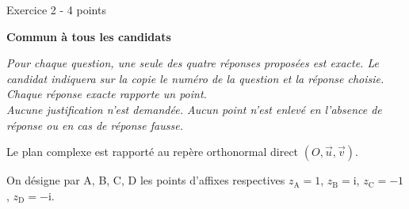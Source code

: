 
%
\begin{h2}Exercice 2 - 4 points\end{h2}
\textbf{Commun à tous les candidats}
\par
\textit{Pour chaque question, une seule des quatre réponses proposées est exacte. Le candidat indiquera sur la copie le numéro de la question et la réponse choisie. Chaque réponse exacte rapporte un point. 
\\
Aucune justification n'est demandée. Aucun point n'est enlevé en l'absence de réponse ou en cas de réponse fausse.}
\par
Le plan complexe est rapporté au repère orthonormal direct $\left(O,\vec{u},\vec{v}\right)$.
\par
On désigne par A, B, C, D les points d'affixes respectives $z_{\text{A}}=1$, $z_{\text{B}}=\text{i}$, $z_{\text{C}}=- 1$, $z_{\text{D}}=- \text{i}$.
